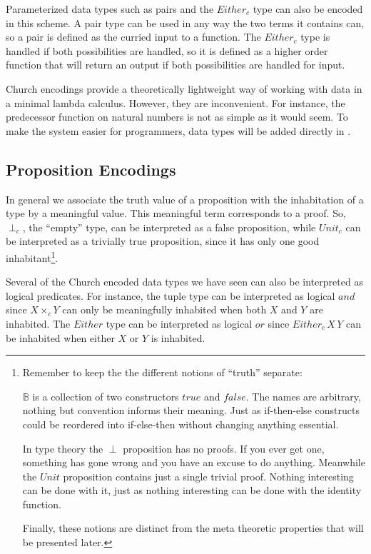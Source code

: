 Parameterized data types such as pairs and the $Either_c$ type can also be encoded in this scheme.
A pair type can be used in any way the two terms it contains can, so a pair is defined as the curried input to a function.
The $Either_c$ type is handled if both possibilities are handled, so it is defined as a higher order function that will return an output if both possibilities are handled for input.


Church encodings provide a theoretically lightweight way of working with data in a minimal lambda calculus.
However, they are inconvenient.
For instance, the predecessor function on natural numbers is not as simple as it would seem.
To make the system easier for programmers, data types will be added directly in .

\subsection{Proposition Encodings}

In general we associate the truth value of a proposition with the inhabitation of a type by a meaningful value.
This meaningful term corresponds to a proof.
So, $\perp_{c}$, the ``empty'' type, can be interpreted as a false proposition, while $Unit_{c}$ can be interpreted as a trivially true proposition, since it has only one good inhabitant\footnote{
  Remember to keep the the different notions of ``truth'' separate:

  $\mathbb{B}$ is a collection of two constructors $true$ and $false$.
  The names are arbitrary, nothing but convention informs their meaning.
  Just as if-then-else constructs could be reordered into if-else-then without changing anything essential.

  In type theory the $\perp$ proposition has no proofs.
  If you ever get one, something has gone wrong and you have an excuse to do anything.
  Meanwhile the $Unit$ proposition contains just a single trivial proof.
  Nothing interesting can be done with it, just as nothing interesting can be done with the identity function.
  
  Finally, these notions are distinct from the meta theoretic properties that will be presented later.
}.

Several of the Church encoded data types we have seen can also be interpreted as logical predicates.
For instance, the tuple type can be interpreted as logical $and$ since $X\times_{c}Y$ can only be meaningfully inhabited when both $X$ and $Y$ are inhabited.
The $Either$ type can be interpreted as logical $or$ since $Either_{c}\,X\,Y$ can be inhabited when either $X$ or $Y$ is inhabited.

